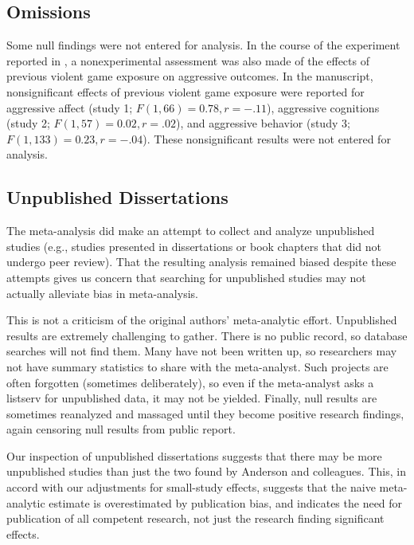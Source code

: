 \documentclass[man]{apa6}
\begin{document}
\subsection{Omissions}
Some null findings were not entered for analysis. %
In the course of the experiment reported in \citet{Carnagey:Anderson:2005}, a nonexperimental assessment was also made of the effects of previous violent game exposure on aggressive outcomes. In the manuscript, nonsignificant effects of previous violent game exposure were reported for aggressive affect (study 1; $F(1, 66) = 0.78, r = -.11$), aggressive cognitions (study 2; $F(1, 57) = 0.02, r = .02$), and aggressive behavior (study 3; $F(1, 133) = 0.23, r = -.04$). These nonsignificant results were not entered for analysis.

\subsection{Unpublished Dissertations}
The \citep{Anderson:etal:2010} meta-analysis did make an attempt to collect and analyze unpublished studies (e.g., studies presented in dissertations or book chapters that did not undergo peer review). That the resulting analysis remained biased despite these attempts gives us concern that searching for unpublished studies may not actually alleviate bias in meta-analysis. 

This is not a criticism of the original authors' meta-analytic effort. Unpublished results are extremely challenging to gather. There is no public record, so database searches will not find them. Many have not been written up, so researchers may not have summary statistics to share with the meta-analyst. Such projects are often forgotten (sometimes deliberately), so even if the meta-analyst asks a listserv for unpublished data, it may not be yielded. Finally, null results are sometimes reanalyzed and massaged until they become positive research findings, again censoring null results from public report.

Our inspection of unpublished dissertations suggests that there may be more unpublished studies than just the two found by Anderson and colleagues. This, in accord with our adjustments for small-study effects, suggests that the naive meta-analytic estimate is overestimated by publication bias, and indicates the need for publication of all competent research, not just the research finding significant effects. 
\end{document}
